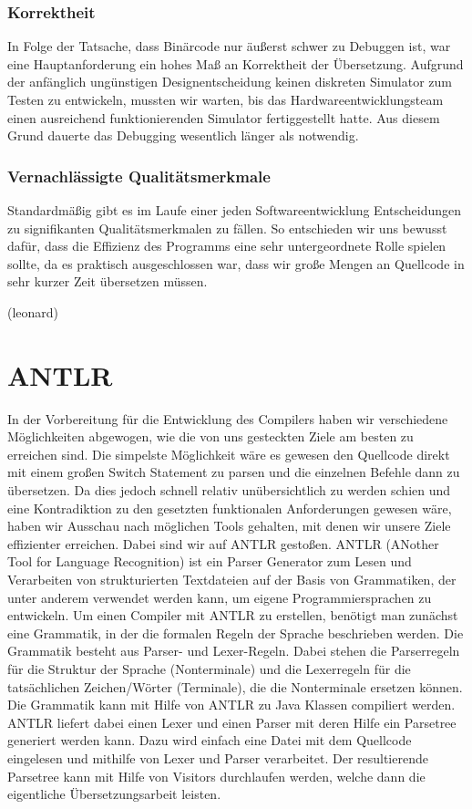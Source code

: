 \documentclass[paper=a4,fontsize=12pt,twocolumn]{scrreprt}
\begin{document}
\subsubsection{Korrektheit}
In Folge der Tatsache, dass Binärcode nur äußerst schwer zu Debuggen ist, war eine Hauptanforderung ein hohes Maß an Korrektheit der Übersetzung.
Aufgrund der anfänglich ungünstigen Designentscheidung keinen diskreten Simulator zum Testen zu entwickeln, mussten wir warten, bis das Hardwareentwicklungsteam einen ausreichend funktionierenden Simulator fertiggestellt hatte. Aus diesem Grund dauerte das Debugging wesentlich länger als notwendig.

\subsubsection{Vernachlässigte Qualitätsmerkmale}
Standardmäßig gibt es im Laufe einer jeden Softwareentwicklung Entscheidungen zu signifikanten Qualitätsmerkmalen zu fällen.
So entschieden wir uns bewusst dafür, dass die Effizienz des Programms eine sehr untergeordnete Rolle spielen sollte, da es praktisch ausgeschlossen war, dass wir große Mengen an Quellcode in sehr kurzer Zeit übersetzen müssen.

(leonard)

\section{ANTLR}
In der Vorbereitung für die Entwicklung des Compilers haben wir verschiedene Möglichkeiten abgewogen, wie die von uns gesteckten Ziele am besten zu erreichen sind.
Die simpelste Möglichkeit wäre es gewesen den Quellcode direkt mit einem großen Switch Statement zu parsen und die einzelnen Befehle dann zu übersetzen.
Da dies jedoch schnell relativ unübersichtlich zu werden schien und eine Kontradiktion zu den gesetzten funktionalen Anforderungen gewesen wäre, haben wir Ausschau nach möglichen Tools gehalten, mit denen wir unsere Ziele effizienter erreichen.
Dabei sind wir auf ANTLR gestoßen.
ANTLR (ANother Tool for Language Recognition) ist ein Parser Generator zum Lesen und Verarbeiten von strukturierten Textdateien auf der Basis von Grammatiken, der unter anderem verwendet werden kann, um eigene Programmiersprachen zu entwickeln.
Um einen Compiler mit ANTLR zu erstellen, benötigt man zunächst eine Grammatik, in der die formalen Regeln der Sprache beschrieben werden.
Die Grammatik besteht aus Parser- und Lexer-Regeln.
Dabei stehen die Parserregeln für die Struktur der Sprache (Nonterminale) und die Lexerregeln für die tatsächlichen Zeichen/Wörter (Terminale), die die Nonterminale ersetzen können.
Die Grammatik kann mit Hilfe von ANTLR zu Java Klassen compiliert werden.
ANTLR liefert dabei einen Lexer und einen Parser mit deren Hilfe ein Parsetree generiert werden kann.
Dazu wird einfach eine Datei mit dem Quellcode eingelesen und mithilfe von Lexer und Parser verarbeitet.
Der resultierende Parsetree kann mit Hilfe von Visitors durchlaufen werden,
welche dann die eigentliche Übersetzungsarbeit leisten.
\end{document}
